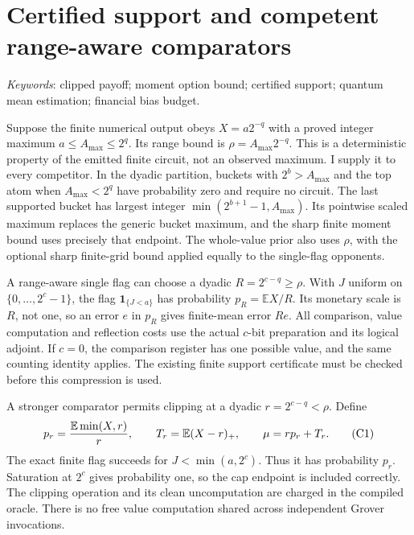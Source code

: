 
\section{Certified support and competent range-aware comparators}
\label{sec:certified-support-comparator}

\emph{Keywords}: clipped payoff; moment option bound; certified support; quantum mean estimation; financial bias budget.

Suppose the finite numerical output obeys \(X=a2^{-q}\) with a proved integer maximum \(a\leq A_{\max}\leq2^q\). Its range bound is \(\rho=A_{\max}2^{-q}\). This is a deterministic property of the emitted finite circuit, not an observed maximum. I supply it to every competitor. In the dyadic partition, buckets with \(2^b>A_{\max}\) and the top atom when \(A_{\max}<2^q\) have probability zero and require no circuit. The last supported bucket has largest integer
\(\min(2^{b+1}-1,A_{\max})\). Its pointwise scaled maximum replaces the generic bucket maximum, and the sharp finite moment bound uses precisely that endpoint. The whole-value prior also uses \(\rho\), with the optional sharp finite-grid bound applied equally to the single-flag opponents.

A range-aware single flag can choose a dyadic \(R=2^{c-q}\geq\rho\). With \(J\) uniform on \(\{0,\ldots,2^c-1\}\), the flag \(\mathbf1_{\{J<a\}}\) has probability \(p_R=\mathbb EX/R\). Its monetary scale is \(R\), not one, so an error \(e\) in \(p_R\) gives finite-mean error \(Re\). All comparison, value computation and reflection costs use the actual \(c\)-bit preparation and its logical adjoint. If \(c=0\), the comparison register has one possible value, and the same counting identity applies. The existing finite support certificate must be checked before this compression is used.

A stronger comparator permits clipping at a dyadic \(r=2^{c-q}<\rho\). Define
\[
 p_r={\mathbb E\min(X,r)\over r},\qquad
 T_r=\mathbb E(X-r)_+,
 \qquad \mu=rp_r+T_r.
 \tag{C1}\label{eq:clip-identity}
\]
The exact finite flag succeeds for \(J<\min(a,2^c)\). Thus it has probability \(p_r\). Saturation at \(2^c\) gives probability one, so the cap endpoint is included correctly. The clipping operation and its clean uncomputation are charged in the compiled oracle. There is no free value computation shared across independent Grover invocations.

